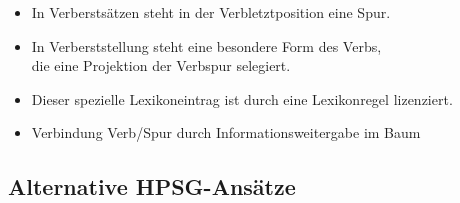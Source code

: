 {{\begin{itemize}[<+->]
\item In Verberstsätzen steht in der Verbletztposition eine Spur.
\item In Verberststellung steht eine besondere Form des Verbs,\\
      die eine Projektion der Verbspur selegiert.
\item Dieser spezielle Lexikoneintrag ist durch eine Lexikonregel lizenziert.
\item Verbindung Verb/Spur durch Informationsweitergabe im Baum
\end{itemize}


\pause\pause\pause
}



\subtitle{Konstituentenreihenfolge: Alternative HPSG-Ansätze}

\huberlintitlepage[22pt]


\subsection{Alternative HPSG-Ansätze}


}
